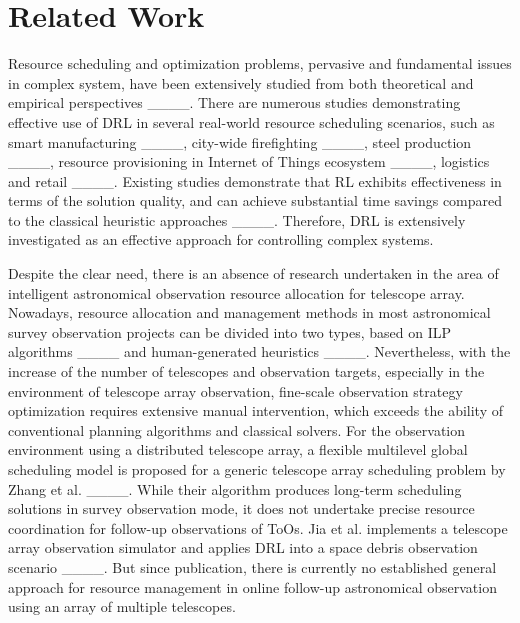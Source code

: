 \section{Related Work}
Resource scheduling and optimization problems, pervasive and fundamental issues in complex system, have been extensively studied from both theoretical and empirical perspectives ____. There are numerous studies demonstrating effective use of DRL in several real-world resource scheduling scenarios, such as smart manufacturing ____, city-wide firefighting ____, steel production ____, resource provisioning in Internet of Things ecosystem ____, logistics and retail ____. Existing studies demonstrate that RL exhibits effectiveness in terms of the solution quality, and can achieve substantial time savings compared to the classical heuristic approaches ____. Therefore, DRL is extensively investigated as an effective approach for controlling complex systems.


Despite the clear need, there is an absence of research undertaken in the area of intelligent astronomical observation resource allocation for telescope array. Nowadays, resource allocation and management methods in most astronomical survey observation projects can be divided into two types, based on ILP algorithms ____ and human-generated heuristics ____. Nevertheless, with the increase of the number of telescopes and observation targets, especially in the environment of telescope array observation, fine-scale observation strategy optimization requires extensive manual intervention, which exceeds the ability of conventional planning algorithms and classical solvers. For the observation environment using a distributed telescope array, a flexible multilevel global scheduling model is proposed for a generic telescope array scheduling problem by Zhang et al. ____. While their algorithm produces long-term scheduling solutions in survey observation mode, it does not undertake precise resource coordination for follow-up observations of ToOs. Jia et al. implements a telescope array observation simulator and applies DRL into a space debris observation scenario ____. But since publication, there is currently no established general approach for resource management in online follow-up astronomical observation using an array of multiple telescopes.

